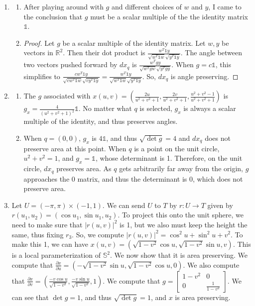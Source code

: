 \documentclass[12pt]{article}
\newcommand{\pderiv}[2][]{\frac{\partial#1}{\partial#2}}
\newcommand{\magnitude}[1]{\left\lvert #1 \right\rvert} %
\begin{document}
\begin{enumerate}[label=\Alph*., leftmargin=*]
    \item \begin{enumerate}
        \item After playing around with $g$ and different choices of $w$ and $y$, I came to the conclusion that $g$ must be a scalar multiple of the the identity matrix $\mathds{1}$.
        \item \begin{proof}
            Let $g$ be a scalar multiple of the identity matrix. Let $w, y$ be vectors in $\mathbb{R}^2$. Then their dot product is $\frac{w^{T}\mathds{1}y}{\sqrt{w^{T}\mathds{1}w}\sqrt{y^{T}\mathds{1}y}}$. The angle between two vectors pushed forward by $dx_q$ is
            $\frac{w^{T}gy}{\sqrt{w^{T}gw}\sqrt{y^{T}gy}}$. When $g=c\mathds{1}$, this simplifies to $\frac{cw^{T}\mathds{1}y}{\sqrt{cw^{T}\mathds{1}w}\sqrt{cy^{T}\mathds{1}y}}=\frac{w^{T}\mathds{1}y}{\sqrt{w^{T}\mathds{1}w}\sqrt{y^{T}\mathds{1}y}}$. So, $dx_q$ is angle preserving.
        \end{proof}
    \end{enumerate}
    \item \begin{enumerate}
        \item The $g$ associated with $x(u,v)=(\frac{2u}{u^2+v^2+1}, \frac{2v}{u^2+v^2+1}, \frac{u^2+v^2-1}{u^2+v^2+1})$ is $g_x=\frac{4}{{(u^2+v^2+1)}^2}\mathds{1}$. No matter what $q$ is selected,
        $g_x$ is always a scalar multiple of the identity, and thus preserves angles.
        \item When $q=(0,0)$, $g_x$ is $4\mathds{1}$, and thus $\sqrt{\det g}=4$ and $dx_q$ does not preserve area at this point.
        When $q$ is a point on the unit circle, $u^2+v^2=1$, and $g_x=\mathds{1}$, whose determinant is 1. Therefore, on the unit circle, $dx_q$ preserves area.
        As $q$ gets arbitrarily far away from the origin, $g$ approaches the 0 matrix, and thus the determinant is 0, which does not preserve area.
    \end{enumerate}
    \item Let $U=(-\pi, \pi)\times (-1, 1)$. We can send $U$ to $T$ by $r: U\to T$ given by $r(u_1,u_2)=(\cos u_1, \sin u_1, u_2)$.
    To project this onto the unit sphere, we need to make sure that $\magnitude{r(u,v)}^2$ is 1, but we also must keep the height the same, thus fixing $r_3$. So, we compute $\magnitude{r(u,v)}^2=\cos^2 u +\sin^2 u + v^2$. To make this 1,
    we can have $x(u,v)=(\sqrt{1-v^2}\cos u, \sqrt{1-v^2}\sin u, v)$. This is a local parameterization of $\mathbb{S}^2$. We now show that it is area preserving. We compute that $\pderiv[x]{u}=(-\sqrt{1-v^2}\sin u, \sqrt{1-v^2}\cos u, 0)$. We also compute that $\pderiv[x]{v}=(\frac{-v\cos u}{\sqrt{1-v^2}}, \frac{-v\sin u}{\sqrt{1-v^2}}, 1)$.
    We compute that $g=\begin{bmatrix}
        1-v^2&0\\
        0&\frac{1}{1-v^2}
    \end{bmatrix}$. We can see that $\det g = 1$, and thus $\sqrt{\det g}= 1$, and $x$ is area preserving.
    \end{enumerate}
\end{document}
